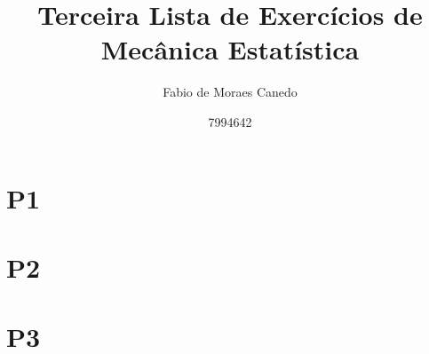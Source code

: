\documentclass[a4paper,12pt]{article}
\title{Terceira Lista de Exercícios de Mecânica Estatística}
\author{Fabio de Moraes Canedo \and
7994642}
\begin{document}
\maketitle

%

%

\section{P1}



\newpage

\section{P2}



\section{P3}



% 
%
%
\end{document}
